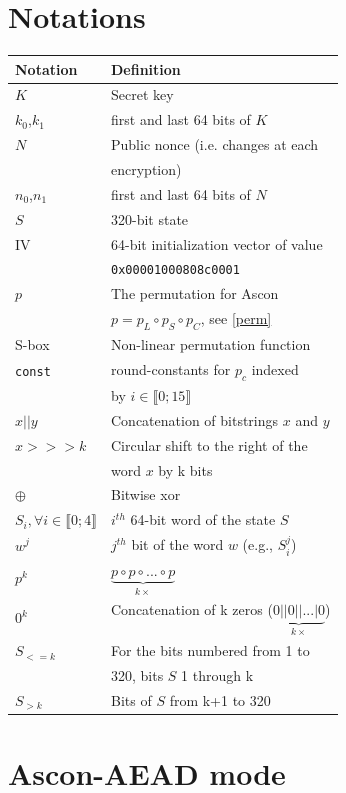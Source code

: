 \documentclass[11pt,technote]{IEEEtran}
\begin{document}
	\section{Notations} \label{notations}
	\begin{tabular}{ll}
		\hline
		\textbf{Notation}&\textbf{Definition}\\
		\hline
		$K$&Secret key\\
		$k_0$,$k_1$&first and last 64 bits of $K$\\
		$N$&Public nonce (i.e. changes at each\\
		&encryption)\\
		$n_0$,$n_1$&first and last 64 bits of $N$\\
		$S$&320-bit state\\
		IV&64-bit initialization vector of value\\
		&\verb|0x00001000808c0001|\\
		$p$&The permutation for Ascon \\
		&$p=p_L \circ p_S \circ p_C$, see \ref{perm}\\
		S-box&Non-linear permutation function\\
		\verb|const|&round-constants for $p_c$ indexed \\
		&by $i \in \llbracket 0;15 \rrbracket$ \\
		\hline
		$x||y$&Concatenation of bitstrings $x$ and $y$\\
		$x>>>k$&Circular shift to the right of the\\
		&word $x$ by k bits\\
		$\oplus$&Bitwise xor\\
		\hline
		$S_i, \forall i \in \llbracket 0;4 \rrbracket$&$i^{th}$ 64-bit word of the state $S$\\
		$w^j$&$j^{th}$ bit of the word $w$ (e.g., $S_i^j$) \\
		$p^k$&$\underbrace{p \circ p \circ ... \circ p}_{k \times}$\\
		$0^k$&Concatenation of k zeros ($\underbrace{0||0|| ... |0}_{k \times}$)\\
		$S_{<=k}$&For the bits numbered from 1 to\\
		&320, bits $S$ 1 through k\\
		$S_{>k}$&Bits of $S$ from k+1 to 320\\
		\hline
	\end{tabular}
	
	
	\section{Ascon-AEAD mode}
	
\end{document}
